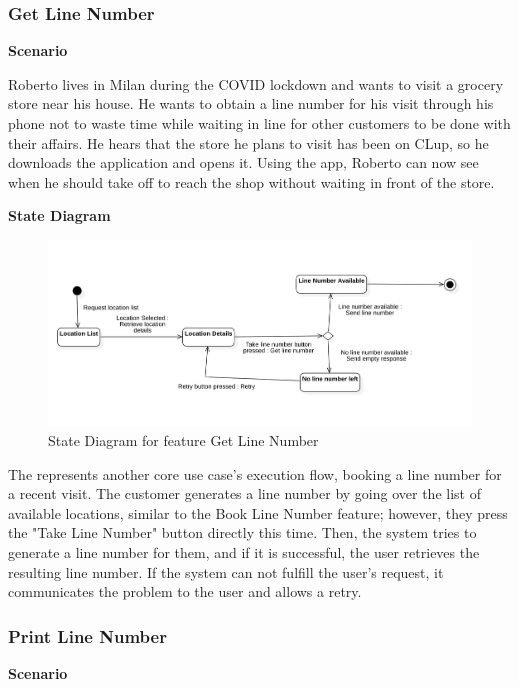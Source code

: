 \subsubsection{Get Line Number}

\textbf{Scenario}

Roberto lives in Milan during the COVID lockdown and wants to visit a grocery store near his house.
He wants to obtain a line number for his visit through his phone not to waste time while waiting in line for other customers to be done with their affairs.
He hears that the store he plans to visit has been on CLup, so he downloads the application and opens it.
Using the app, Roberto can now see when he should take off to reach the shop without waiting in front of the store.

\textbf{State Diagram}

\begin{figure}[H]
    \centering
    \includegraphics[height=0.4\textwidth]{Images/StateCharts/GenerateLineNumber.png}
    \caption{State Diagram for feature Get Line Number}
    \label{fig:SDGetLine}
\end{figure}

The  represents another core use case's execution flow, booking a line number for a recent visit.
The customer generates a line number by going over the list of available locations, similar to the Book Line Number feature; however, they press the "Take Line Number" button directly this time.
Then, the system tries to generate a line number for them, and if it is successful, the user retrieves the resulting line number.
If the system can not fulfill the user's request, it communicates the problem to the user and allows a retry.

\subsubsection{Print Line Number}

\textbf{Scenario}

